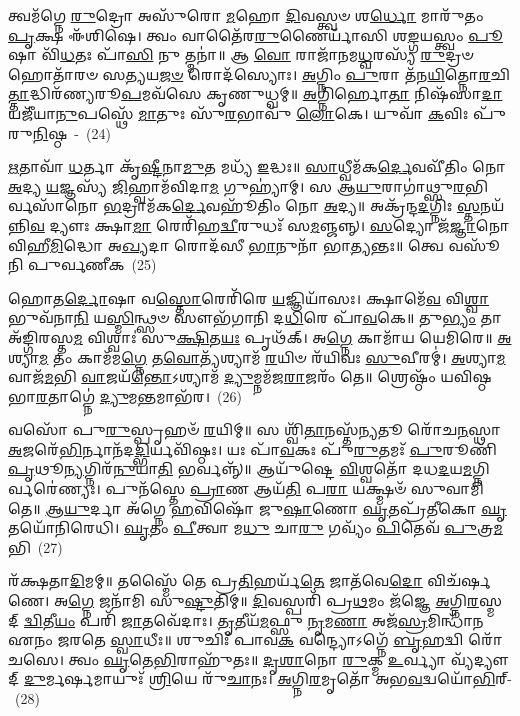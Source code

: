 {\anuvakamend[{𑌨𑍁 \ul{𑌸}\-𑌪𑍍𑌤𑌚᳴𑌤𑍍𑌵𑌾𑌰𑌿𑍞𑌶𑌚𑍍𑌚}]}%

𑌤𑍍𑌵𑌮᳴𑌗𑍍𑌨𑍇 \ul{𑌰𑍁}\-𑌦𑍍𑌰𑍋 𑌅𑌸𑍁᳴𑌰𑍋 \ul{𑌮}\-𑌹𑍋 \ul{𑌦𑌿}\-𑌵𑌸𑍍𑌤𑍍𑌵𑍞 𑌶\-\ul{𑌰𑍍𑌧𑍋} 𑌮𑌾𑌰𑍁᳴𑌤𑌂 \ul{𑌪𑍃}\-𑌕𑍍𑌷 𑌈᳴𑌶𑌿𑌷𑍇। 𑌤𑍍𑌵𑌂 𑌵𑌾𑌤𑍈᳴𑌰\-\ul{𑌰𑍁}\-𑌣𑍈𑌰𑍍𑌯𑌾᳴𑌸𑌿 𑌶\-\ul{𑌙𑍍𑌗}\-𑌯𑌸𑍍𑌤𑍍𑌵𑌂 \ul{𑌪𑍂}\-𑌷𑌾 𑌵𑌿᳴\-\ul{𑌧}\-𑌤𑌃 𑌪𑌾᳴\-\ul{𑌸𑌿} 𑌨𑍁 𑌤𑍍𑌮𑌨𑌾॑॥ 𑌆 \ul{𑌵𑍋} 𑌰𑌾𑌜𑌾᳴𑌨𑌮\-\ul{𑌧𑍍𑌵}\-𑌰𑌸𑍍𑌯᳴ \ul{𑌰𑍁}\-𑌦𑍍𑌰𑍞 𑌹𑍋𑌤𑌾᳴𑌰𑍞 𑌸\-\ul{𑌤𑍍𑌯}\-𑌯\-\ul{𑌜}\-\-\ul{𑍞} 𑌰𑍋𑌦᳴𑌸𑍍𑌯𑍋𑌃। \ul{𑌅}\-𑌗𑍍𑌨𑌿𑌂 \ul{𑌪𑍁}\-𑌰𑌾 𑌤᳴𑌨\-\ul{𑌯𑌿}\-𑌤𑍍𑌨𑍋\-\ul{𑌰}\-𑌚𑌿\-\ul{𑌤𑍍𑌤𑌾}\-𑌦𑍍𑌧𑌿𑌰᳴𑌣𑍍𑌯𑌰𑍂\-\ul{𑌪}\-𑌮𑌵᳴𑌸𑍇 𑌕𑍃𑌣𑍁𑌧𑍍𑌵𑌮𑍍॥ \ul{𑌅}\-𑌗𑍍𑌨𑌿𑌰𑍍\mbox{}𑌹𑍋\-\ul{𑌤𑌾} 𑌨𑌿𑌷᳴𑌸𑌾\-\ul{𑌦𑌾} 𑌯𑌜𑍀᳴𑌯𑌾\-\ul{𑌨𑍁}\-𑌪𑌸𑍍𑌥𑍇᳴ \ul{𑌮𑌾}\-𑌤𑍁𑌃 𑌸𑍁᳴\-\ul{𑌰}\-𑌭𑌾𑌵𑍁᳴ \ul{𑌲𑍋}\-𑌕𑍇। 𑌯𑍁𑌵𑌾᳴ \ul{𑌕}\-𑌵𑌿𑌃 𑌪𑍁᳴𑌰𑍁\-\ul{𑌨𑌿}\-𑌷𑍍𑌠~-~(24)

\-\ul{𑌋}\-𑌤𑌾𑌵𑌾᳴ \ul{𑌧}\-𑌰𑍍𑌤𑌾 𑌕𑍃᳴\-\ul{𑌷𑍍𑌟𑍀}\-𑌨𑌾\-\ul{𑌮𑍁}\-𑌤 𑌮𑌧𑍍𑌯᳴ \ul{𑌇}\-𑌦𑍍𑌧𑌃॥ \ul{𑌸𑌾}\-𑌧𑍍𑌵𑍀𑌮᳴𑌕\-\ul{𑌰𑍍𑌦𑍇}\-𑌵𑌵𑍀᳴𑌤𑌿𑌂 𑌨𑍋 \ul{𑌅}\-𑌦𑍍𑌯 \ul{𑌯}\-𑌜𑍍𑌞𑌸𑍍𑌯᳴ \ul{𑌜𑌿}\-𑌹𑍍𑌵𑌾𑌮᳴𑌵𑌿𑌦𑌾\-\ul{𑌮} 𑌗𑍁𑌹𑍍𑌯𑌾॑𑌮𑍍। 𑌸 𑌆\-\ul{𑌯𑍁}\-𑌰𑌾𑌗𑌾॑𑌥𑍍𑌸𑍁\-\ul{𑌰}\-\-𑌭𑌿𑌰𑍍𑌵𑌸𑌾᳴𑌨𑍋 \ul{𑌭}\-𑌦𑍍𑌰𑌾𑌮᳴𑌕\-\ul{𑌰𑍍𑌦𑍇}\-𑌵𑌹𑍂᳴𑌤𑌿𑌂 𑌨𑍋 \ul{𑌅}\-𑌦𑍍𑌯॥ 𑌅𑌕𑍍𑌰᳴𑌨𑍍𑌦\-\ul{𑌦}\-𑌗𑍍𑌨𑌿𑌃 \ul{𑌸𑍍𑌤}\-𑌨𑌯᳴𑌨𑍍𑌨𑌿\-\ul{𑌵} 𑌦𑍍𑌯𑍗𑌃 𑌕𑍍𑌷𑌾\-\ul{𑌮𑌾} 𑌰𑍇𑌰𑌿᳴𑌹\-\ul{𑌦𑍍𑌵𑍀}\-𑌰𑍁𑌧𑌃᳴ 𑌸\-\ul{𑌮}\-𑌞𑍍𑌜𑌨𑍍𑌨𑍍। \ul{𑌸}\-𑌦𑍍𑌯𑍋 𑌜᳴\-\ul{𑌜𑍍𑌞𑌾}\-𑌨𑍋 𑌵𑌿𑌹𑍀\-\ul{𑌮𑌿}\-𑌦𑍍𑌧𑍋 𑌅\-\ul{𑌖𑍍𑌯}\-𑌦𑌾 𑌰𑍋𑌦᳴𑌸𑍀 \ul{𑌭𑌾}\-𑌨𑍁𑌨𑌾᳴ 𑌭𑌾\-\ul{𑌤𑍍𑌯}\-𑌨𑍍𑌤𑌃॥ 𑌤𑍍𑌵𑍇 𑌵𑌸𑍂᳴𑌨𑌿 𑌪𑍁𑌰𑍍𑌵𑌣𑍀𑌕~(25)

𑌹𑍋𑌤\-\ul{𑌰𑍍𑌦𑍋}\-𑌷𑌾 𑌵\-\ul{𑌸𑍍𑌤𑍋}\-𑌰𑍇𑌰𑌿᳴𑌰𑍇 \ul{𑌯}\-𑌜𑍍𑌞𑌿𑌯𑌾᳴𑌸𑌃। 𑌕𑍍𑌷𑌾𑌮𑍇᳴\-\ul{𑌵} 𑌵𑌿\-\ul{𑌶𑍍𑌵𑌾} 𑌭𑍁𑌵᳴𑌨𑌾\-\ul{𑌨𑌿} 𑌯\-\ul{𑌸𑍍𑌮𑌿}\-𑌨𑍍𑌥𑍍𑌸𑍞 𑌸𑍗𑌭᳴𑌗𑌾𑌨𑌿 𑌦\-\ul{𑌧𑌿}\-𑌰𑍇 𑌪𑌾᳴\-\ul{𑌵}\-𑌕𑍇॥ 𑌤𑍁\-\ul{𑌭𑍍𑌯𑌂} 𑌤𑌾 𑌅᳴𑌙𑍍𑌗𑌿𑌰𑌸𑍍𑌤\-\ul{𑌮} 𑌵𑌿𑌶𑍍𑌵𑌾𑌃॑ 𑌸𑍁\-\ul{𑌕𑍍𑌷𑌿}\-𑌤\-\ul{𑌯𑌃} 𑌪𑍃𑌥᳴𑌕𑍍। 𑌅\-\ul{𑌗𑍍𑌨𑍇} 𑌕𑌾𑌮𑌾᳴𑌯 𑌯𑍇𑌮𑌿𑌰𑍇॥ \ul{𑌅}\-𑌶𑍍𑌯𑌾\-\ul{𑌮} 𑌤𑌂 𑌕𑌾𑌮᳴𑌮\-\ul{𑌗𑍍𑌨𑍇} 𑌤\-\ul{𑌵𑍋}\-𑌤𑍍𑌯᳴𑌶𑍍𑌯𑌾𑌮᳴ \ul{𑌰}\-𑌯𑌿𑍞 𑌰᳴𑌯𑌿𑌵𑌃 \ul{𑌸𑍁}\-𑌵𑍀𑌰𑌮𑍍॑। \ul{𑌅}\-𑌶𑍍𑌯𑌾\-\ul{𑌮} 𑌵𑌾𑌜᳴\-\ul{𑌮}\-𑌭𑌿 \ul{𑌵𑌾}\-𑌜𑌯᳴\-\ul{𑌨𑍍𑌤𑍋}\-\-𑌽𑌶𑍍𑌯𑌾𑌮᳴ \ul{𑌦𑍍𑌯𑍁}\-𑌮𑍍𑌨𑌮᳴𑌜\-\ul{𑌰𑌾}\-𑌜𑌰𑌂᳴ 𑌤𑍇॥ 𑌶𑍍𑌰𑍇𑌷𑍍𑌠𑌂᳴ 𑌯𑌵𑌿𑌷𑍍𑌠 𑌭𑌾\-\ul{𑌰}\-𑌤𑌾𑌗𑍍𑌨𑍇॑ \ul{𑌦𑍍𑌯𑍁}\-𑌮\-\ul{𑌨𑍍𑌤}\-𑌮𑌾𑌭᳴𑌰।~(26)

𑌵𑌸𑍋᳴ 𑌪𑍁\-\ul{𑌰𑍁}\-𑌸𑍍𑌪𑍃𑌹𑍞᳴ \ul{𑌰}\-𑌯𑌿𑌮𑍍॥ 𑌸 𑌶𑍍𑌵𑌿᳴\-\ul{𑌤𑌾}\-𑌨𑌸𑍍𑌤᳴\-\ul{𑌨𑍍𑌯}\-𑌤𑍂 𑌰𑍋᳴𑌚\-\ul{𑌨}\-𑌸𑍍𑌥𑌾 \ul{𑌅}\-𑌜𑌰𑍇᳴\-\ul{𑌭𑌿}\-𑌰𑍍𑌨𑌾𑌨᳴𑌦\-\ul{𑌦𑍍𑌭𑌿}\-𑌰𑍍𑌯𑌵𑌿᳴𑌷𑍍𑌠𑌃। 𑌯𑌃 𑌪𑌾᳴\-\ul{𑌵}\-𑌕𑌃 𑌪𑍁᳴\-\ul{𑌰𑍁}\-𑌤𑌮𑌃᳴ \ul{𑌪𑍁}\-𑌰𑍂𑌣𑌿᳴ \ul{𑌪𑍃}\-𑌥𑍂\-\ul{𑌨𑍍𑌯}\-𑌗𑍍𑌨𑌿𑌰᳴\-\ul{𑌨𑍁}\-𑌯𑌾\-\ul{𑌤𑌿} 𑌭𑌰𑍍𑌵𑌨𑍍𑌨𑍍᳴॥ 𑌆𑌯𑍁᳴𑌷𑍍𑌟𑍇 \ul{𑌵𑌿}\-𑌶𑍍𑌵𑌤𑍋᳴ 𑌦𑌧\-\ul{𑌦}\-𑌯\-\ul{𑌮}\-𑌗𑍍𑌨𑌿𑌰𑍍𑌵𑌰𑍇॑𑌣𑍍𑌯𑌃। 𑌪𑍁𑌨᳴𑌸𑍍𑌤𑍇 \ul{𑌪𑍍𑌰𑌾}\-𑌣 𑌆𑌯᳴\-\ul{𑌤𑌿} 𑌪\-\ul{𑌰𑌾} 𑌯𑌕𑍍𑌷𑍍𑌮𑍞᳴ 𑌸𑍁𑌵𑌾𑌮𑌿 𑌤𑍇॥ \ul{𑌆}\-\-\ul{𑌯𑍁}\-𑌰𑍍𑌦𑌾 𑌅᳴𑌗𑍍𑌨𑍇 \ul{𑌹}\-𑌵𑌿𑌷𑍋᳴ 𑌜𑍁\-\ul{𑌷𑌾}\-𑌣𑍋 \ul{𑌘𑍃}\-𑌤𑌪𑍍𑌰᳴𑌤𑍀𑌕𑍋 \ul{𑌘𑍃}\-𑌤𑌯𑍋᳴𑌨𑌿𑌰𑍇𑌧𑌿। \ul{𑌘𑍃}\-𑌤𑌂 \ul{𑌪𑍀}\-𑌤𑍍𑌵𑌾 𑌮\-\ul{𑌧𑍁} 𑌚𑌾\-\ul{𑌰𑍁} 𑌗𑌵𑍍𑌯𑌂᳴ \ul{𑌪𑌿}\-𑌤𑍇𑌵᳴ \ul{𑌪𑍁}\-𑌤𑍍𑌰\-\ul{𑌮}\-𑌭𑌿~(27)

𑌰᳴𑌕𑍍𑌷𑌤𑌾\-\ul{𑌦𑌿}\-𑌮𑌮𑍍॥ 𑌤𑌸𑍍𑌮𑍈᳴ 𑌤𑍇 𑌪𑍍𑌰\-\ul{𑌤𑌿}\-𑌹𑌰𑍍𑌯᳴\-\ul{𑌤𑍇} 𑌜𑌾𑌤᳴𑌵𑍇\-\ul{𑌦𑍋} 𑌵𑌿𑌚᳴𑌰𑍍\mbox{}𑌷𑌣𑍇। 𑌅\-\ul{𑌗𑍍𑌨𑍇} 𑌜𑌨𑌾᳴𑌮𑌿 𑌸𑍁\-\ul{𑌷𑍍𑌟𑍁}\-𑌤𑌿𑌮𑍍॥ \ul{𑌦𑌿}\-𑌵𑌸𑍍𑌪𑌰𑌿᳴ 𑌪𑍍𑌰\-\ul{𑌥}\-𑌮𑌂 𑌜᳴𑌜𑍍𑌞𑍇 \ul{𑌅}\-𑌗𑍍𑌨𑌿\-\ul{𑌰}\-𑌸𑍍𑌮𑌦𑍍 \ul{𑌦𑍍𑌵𑌿}\-𑌤𑍀\-\ul{𑌯𑌂} 𑌪𑌰𑌿᳴ \ul{𑌜𑌾}\-𑌤𑌵𑍇᳴𑌦𑌾𑌃। \ul{𑌤𑍃}\-𑌤𑍀𑌯᳴\-\ul{𑌮}\-𑌫𑍍𑌸𑍁 \ul{𑌨𑍃}\-𑌮\-\ul{𑌣𑌾} 𑌅𑌜᳴\-\ul{𑌸𑍍𑌰}\-𑌮𑌿𑌨𑍍𑌧𑌾᳴𑌨 𑌏𑌨𑌂 𑌜𑌰𑌤𑍇 \ul{𑌸𑍍𑌵𑌾}\-𑌧𑍀𑌃॥ 𑌶𑍁𑌚𑌿𑌃᳴ 𑌪𑌾𑌵\-\ul{𑌕} 𑌵𑌨𑍍𑌦𑍍𑌯𑍋\-𑌽𑌗𑍍𑌨𑍇᳴ \ul{𑌬𑍃}\-𑌹𑌦𑍍𑌵𑌿 𑌰𑍋᳴𑌚𑌸𑍇। 𑌤𑍍𑌵𑌂 \ul{𑌘𑍃}\-𑌤𑍇\-\ul{𑌭𑌿}\-𑌰𑌾𑌹𑍁᳴𑌤𑌃॥ \ul{𑌦𑍃}\-\-\ul{𑌶𑌾}\-𑌨𑍋 \ul{𑌰𑍁}\-𑌕𑍍𑌮 \ul{𑌉}\-𑌰𑍍𑌵𑍍𑌯𑌾 𑌵𑍍𑌯᳴𑌦𑍍𑌯𑍗𑌦𑍍 \ul{𑌦𑍁}\-𑌰𑍍𑌮𑌰𑍍\mbox{}\-\ul{𑌷}\-𑌮𑌾𑌯𑍁𑌃᳴ \ul{𑌶𑍍𑌰𑌿}\-𑌯𑍇 𑌰𑍁᳴\-\ul{𑌚𑌾}\-𑌨𑌃। \ul{𑌅}\-𑌗𑍍𑌨𑌿\-\ul{𑌰}\-𑌮𑍃𑌤𑍋᳴ 𑌅𑌭\-\ul{𑌵}\-𑌦𑍍𑌵𑌯𑍋᳴\-\ul{𑌭𑌿}\-𑌰𑍍-~(28)

